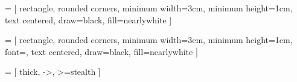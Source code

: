 
 = [
    rectangle,
    rounded corners,
    minimum width=3cm,
    minimum height=1cm,
    text centered,
    draw=black,
    fill=nearlywhite
]

 = [
    rectangle,
    rounded corners,
    minimum width=3cm,
    minimum height=1cm,
    font=\Large,
    text centered,
    draw=black,
    fill=nearlywhite
]

 = [
    thick,
    ->,
    >=stealth   %
]

